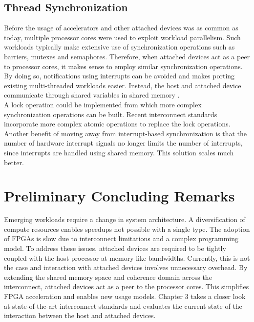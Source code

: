 \subsection{Thread Synchronization}
Before the usage of accelerators and other attached devices was as common as today, multiple processor cores were used to exploit workload parallelism. Such workloads typically make extensive use of synchronization operations such as barriers, mutexes and semaphores. Therefore, when attached devices act as a peer to processor cores, it makes sense to employ similar synchronization operations. By doing so, notifications using interrupts can be avoided and makes porting existing multi-threaded workloads easier. Instead, the host and attached device communicate through shared variables in shared memory \cite{intel-white}.\\
A lock operation could be implemented from which more complex synchronization operations can be built. Recent interconnect standards incorporate more complex atomic operations to replace the lock operations.\\
Another benefit of moving away from interrupt-based synchronization is that the number of hardware interrupt signals no longer limits the number of interrupts, since interrupts are handled using shared memory. This solution scales much better.





\section{Preliminary Concluding Remarks}
Emerging workloads require a change in system architecture. A diversification of compute resources enables speedups not possible with a single type. The adoption of FPGAs is slow due to interconnect limitations and a complex programming model. To address these issues, attached devices are required to be tightly coupled with the host processor at memory-like bandwidths. Currently, this is not the case and interaction with attached devices involves unnecessary overhead. By extending the shared memory space and coherence domain across the interconnect, attached devices act as a peer to the processor cores. This simplifies FPGA acceleration and enables new usage models. Chapter 3 takes a closer look at state-of-the-art interconnect standards and evaluates the current state of the interaction between the host and attached devices.



